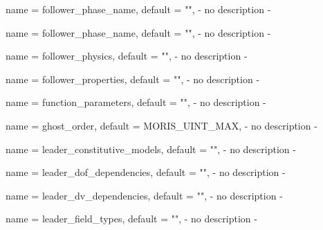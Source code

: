 \begin{parameter}{
    name    = {follower_phase_name},
    default = {""},
}
- no description -
\end{parameter}

\begin{parameter}{
    name    = {follower_phase_name},
    default = {""},
}
- no description -
\end{parameter}

\begin{parameter}{
    name    = {follower_physics},
    default = {""},
}
- no description -
\end{parameter}

\begin{parameter}{
    name    = {follower_properties},
    default = {""},
}
- no description -
\end{parameter}

\begin{parameter}{
    name    = {function_parameters},
    default = {""},
}
- no description -
\end{parameter}

\begin{parameter}{
    name    = {ghost_order},
    default = {MORIS_UINT_MAX},
}
- no description -
\end{parameter}

\begin{parameter}{
    name    = {leader_constitutive_models},
    default = {""},
}
- no description -
\end{parameter}

\begin{parameter}{
    name    = {leader_dof_dependencies},
    default = {""},
}
- no description -
\end{parameter}

\begin{parameter}{
    name    = {leader_dv_dependencies},
    default = {""},
}
- no description -
\end{parameter}

\begin{parameter}{
    name    = {leader_field_types},
    default = {""},
}
- no description -
\end{parameter}

